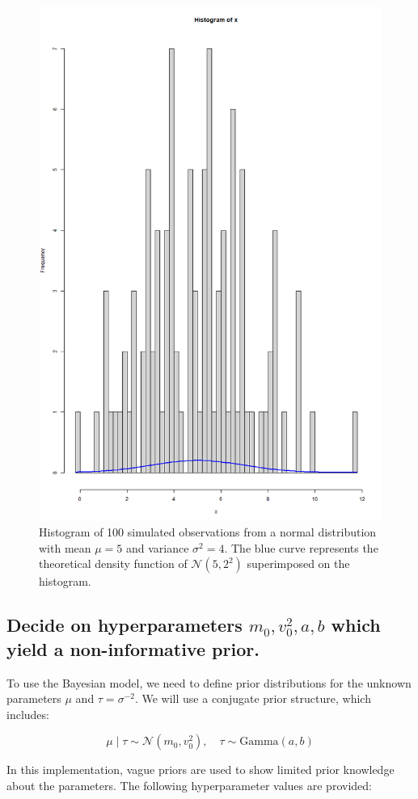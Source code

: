 \documentclass[]{article}
\begin{document}
\begin{figure}[H]
	\centering
	\includegraphics[width=0.7\linewidth]{img/img-2-norm-dist}
	\caption{Histogram of 100 simulated observations from a normal distribution with mean $\mu = 5$ and variance $\sigma^2 = 4$. The blue curve represents the theoretical density function of $\mathcal{N}(5, 2^2)$ superimposed on the histogram.}
	\label{fig:img-2-norm-dist}
\end{figure}


\subsection{Decide on hyperparameters $m_0, v_0^2, a, b$ which yield a non-informative prior.}


To use the Bayesian model, we need to define prior distributions for the unknown parameters $\mu$ and $\tau = \sigma^{-2}$. We will use a conjugate prior structure, which includes:

$$
\mu \mid \tau \sim \mathcal{N}(m_0, v_0^2), \quad \tau \sim \text{Gamma}(a, b)
$$

In this implementation, vague priors are used to show limited prior knowledge about the parameters. The following hyperparameter values are provided:
\end{document}
